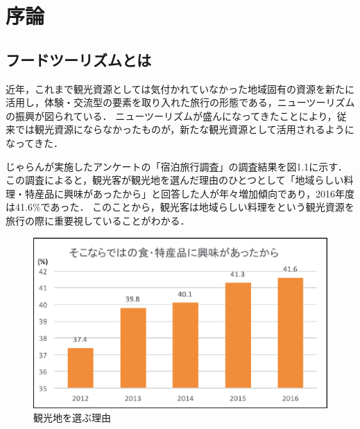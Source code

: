 \documentclass{funthesis}
\begin{document}
\tableofcontents %






\chapter{序論} 

\section{フードツーリズムとは}
近年，これまで観光資源としては気付かれていなかった地域固有の資源を新たに活用し，体験・交流型の要素を取り入れた旅行の形態である，ニューツーリズムの振興が図られている\cite{1}．
ニューツーリズムが盛んになってきたことにより，従来では観光資源にならなかったものが，新たな観光資源として活用されるようになってきた．

じゃらんが実施したアンケートの「宿泊旅行調査」の調査結果を図1.1に示す\cite{2}．
この調査によると，観光客が観光地を選んだ理由のひとつとして「地域らしい料理・特産品に興味があったから」と回答した人が年々増加傾向であり，2016年度は41.6\%であった．
このことから，観光客は地域らしい料理をという観光資源を旅行の際に重要視していることがわかる．

\begin{figure}[!b]
  \begin{center}
    \includegraphics[clip,width=13cm]{jaran.eps}
    \caption{観光地を選ぶ理由}
  \end{center}
\end{figure}
\end{document}
